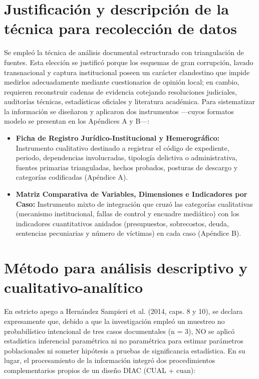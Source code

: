 \section{Justificación y descripción de la técnica para recolección de datos}

Se empleó la técnica de análisis documental estructurado con triangulación de fuentes. Esta elección se justificó porque los esquemas de gran corrupción, lavado transnacional y captura institucional poseen un carácter clandestino que impide medirlos adecuadamente mediante cuestionarios de opinión local; en cambio, requieren reconstruir cadenas de evidencia cotejando resoluciones judiciales, auditorías técnicas, estadísticas oficiales y literatura académica. Para sistematizar la información se diseñaron y aplicaron dos instrumentos ---cuyos formatos modelo se presentan en los Apéndices A y B---:

\begin{itemize}
  \item \textbf{Ficha de Registro Jurídico-Institucional y Hemerográfico:} Instrumento cualitativo destinado a registrar el código de expediente, periodo, dependencias involucradas, tipología delictiva o administrativa, fuentes primarias trianguladas, hechos probados, posturas de descargo y categorías codificadas (Apéndice A).
  
  \item \textbf{Matriz Comparativa de Variables, Dimensiones e Indicadores por Caso:} Instrumento mixto de integración que cruzó las categorías cualitativas (mecanismo institucional, fallas de control y encuadre mediático) con los indicadores cuantitativos anidados (presupuestos, sobrecostos, deuda, sentencias pecuniarias y número de víctimas) en cada caso (Apéndice B).
\end{itemize}

\section{Método para análisis descriptivo y cualitativo-analítico}

En estricto apego a Hernández Sampieri et al. (2014, caps. 8 y 10), se declara expresamente que, debido a que la investigación empleó un muestreo no probabilístico intencional de tres casos documentales (n = 3), NO se aplicó estadística inferencial paramétrica ni no paramétrica para estimar parámetros poblacionales ni someter hipótesis a pruebas de significancia estadística. En su lugar, el procesamiento de la información integró dos procedimientos complementarios propios de un diseño DIAC (CUAL + cuan):

